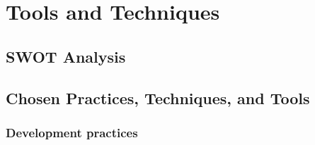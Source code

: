 \section{Tools and Techniques}
\subsection{SWOT Analysis}

\begin{table*}
	\centering
		\begin{tabular}
			\textbf{Strenhtg s
		\end{tabular}
	\caption{Swot Analaysis}
	\label{tab:SwotAnalaysis}
\end{table*}


\subsection{Chosen Practices, Techniques, and Tools}



\subsubsection{Development practices}


